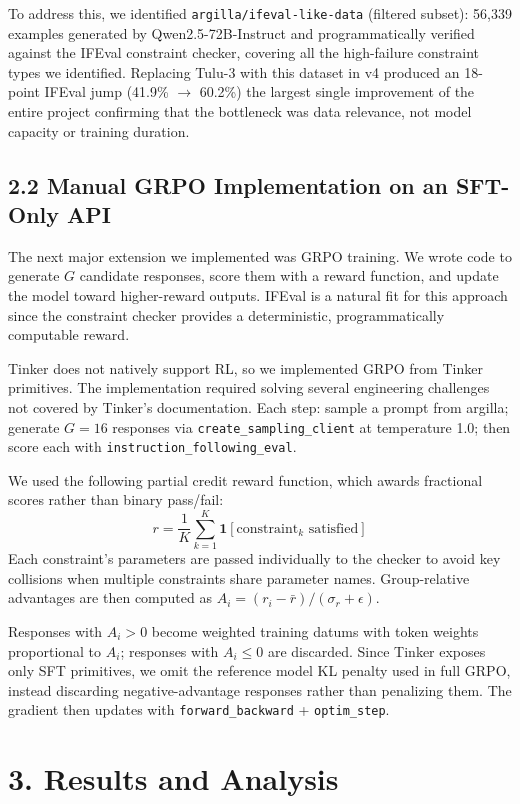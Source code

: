 \documentclass[10pt,letterpaper]{article}
\begin{document}
To address this, we identified \texttt{argilla/ifeval-like-data} (filtered subset): 
56,339 examples generated by Qwen2.5-72B-Instruct and programmatically verified 
against the IFEval constraint checker, covering all the high-failure constraint types 
we identified. Replacing Tulu-3 with this dataset in v4 produced an 18-point IFEval 
jump (41.9\% $\to$ 60.2\%)  the largest single improvement of the entire project 
confirming that the bottleneck was data relevance, not model capacity or training 
duration.

\subsection{2.2 Manual GRPO Implementation on an SFT-Only API}
The next major extension we implemented was GRPO training. We wrote code to generate 
$G$ candidate responses, score them with a reward function, and update the model toward 
higher-reward outputs. IFEval is a natural fit for this approach since the constraint 
checker provides a deterministic, programmatically computable reward.

Tinker does not natively support RL, so we implemented GRPO from Tinker primitives. 
The implementation required solving several engineering challenges not covered by 
Tinker's documentation. Each step: sample a prompt from argilla; generate $G{=}16$ 
responses via \texttt{create\_sampling\_client} at temperature 1.0; then score each 
with \texttt{instruction\_following\_eval}.

We used the following partial credit reward function, which awards fractional scores 
rather than binary pass/fail:
\[
r = \frac{1}{K} \sum_{k=1}^{K} \mathbf{1}[\text{constraint}_k \text{ satisfied}]
\]
Each constraint's parameters are passed individually to the checker to avoid key 
collisions when multiple constraints share parameter names. Group-relative advantages 
are then computed as $A_i = (r_i - \bar{r}) / (\sigma_r + \epsilon)$.

Responses with $A_i > 0$ become weighted training datums with token weights 
proportional to $A_i$; responses with $A_i \leq 0$ are discarded. Since Tinker exposes only SFT primitives, we omit the reference model KL penalty used in full GRPO, instead discarding negative-advantage responses rather than penalizing them. The gradient then updates with
\texttt{forward\_backward} + \texttt{optim\_step}.

\section{3. Results and Analysis}
\end{document}
